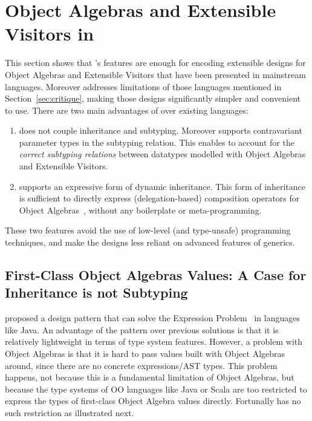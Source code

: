 \section{Object Algebras and Extensible Visitors in \name}
\label{sec:OA}

This section shows that \name's features are enough for encoding extensible
designs for Object Algebras and Extensible Visitors that have been presented in
mainstream languages. Moreover \name addresses limitations of those languages
mentioned in Section~\ref{sec:critique}, making those designs significantly
simpler and convenient to use. There are two main advantages of \name over
existing languages:
\begin{enumerate}
\item \name does not couple inheritance and subtyping. Moreover
\name supports contravariant parameter types in the subtyping
relation. This enables \name to account for the \emph{correct
subtyping relations} between datatypes modelled with Object Algebras
and Extensible Visitors.
\item \name supports an expressive form of dynamic inheritance. This form
  of inheritance is sufficient to directly express (delegation-based) composition
  operators for Object Algebras~\cite{oliveira2012extensibility}, without any boilerplate or meta-programming.
\end{enumerate}

These two features avoid the use of low-level (and type-unsafe) programming
techniques, and make the designs less reliant on advanced
features of generics.


\subsection{First-Class Object Algebras Values: A Case for Inheritance
is not Subtyping}
\label{sec:objectalgebra}

\citet{oliveira2012extensibility} proposed a design pattern that can solve the
Expression Problem~\cite{wadler1998expression} in languages like Java. An
advantage of the pattern over previous solutions is that it is relatively
lightweight in terms of type system features. However, a problem with Object
Algebras is that it is hard to pass values built with Object Algebras around,
since there are no concrete expressions/AST types. This problem happens, not
because this is a fundamental limitation of Object Algebras, but because the
type systems of OO languages like Java or Scala are too restricted to express
the types of first-class Object Algebra values directly. Fortunally \name has no
such restriction as illustrated next.


